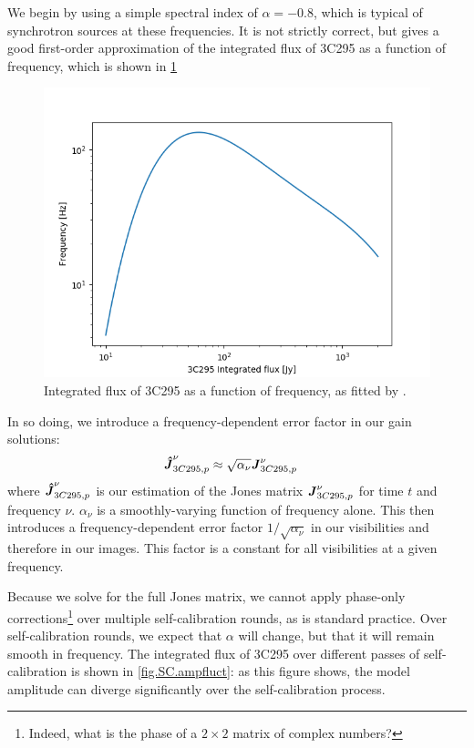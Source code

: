 \pg
We begin by using a simple spectral index of $\alpha=-0.8$, which is typical of synchrotron sources at these frequencies. It is not strictly correct, but gives a good first-order approximation of the integrated flux of 3C295 as a function of frequency, which is shown in \cref{fig.3c295.intflux}
\begin{figure}[h]
\includegraphics[width=0.8\linewidth]{images/3C295-intflux.png}
\caption{\label{fig.3c295.intflux} Integrated flux of 3C295 as a function of frequency, as fitted by .}
\end{figure}


In so doing, we introduce a frequency-dependent error factor in our gain solutions:
\begin{align}
\textbf{\emph{\^{J}}}_{3C295,p}^{\nu} &\approx \sqrt{\alpha_\nu} \textbf{\emph{J}}_{3C295,p}^{\nu}
\end{align}
where $\textbf{\emph{\^{J}}}_{3C295,p}^{\nu}$ is our estimation of the Jones matrix $\textbf{\emph{J}}_{3C295,p}^{\nu}$ for time $t$ and frequency $\nu$. $\alpha_\nu$ is a smoothly-varying function of frequency alone. This then introduces a frequency-dependent error factor $1/\sqrt{\alpha_\nu}$ in our visibilities and therefore in our images. This factor is a constant for all visibilities at a given frequency.

\pg
Because we solve for the full Jones matrix, we cannot apply phase-only corrections\footnote{Indeed, what is the phase of a $2\times2$ matrix of complex numbers?} over multiple self-calibration rounds, as is standard practice. Over self-calibration rounds, we expect that $\alpha$ will change, but that it will remain smooth in frequency. The integrated flux of 3C295 over different passes of self-calibration is shown in \cref{fig.SC.ampfluct}: as this figure shows, the model amplitude can diverge significantly over the self-calibration process. %

